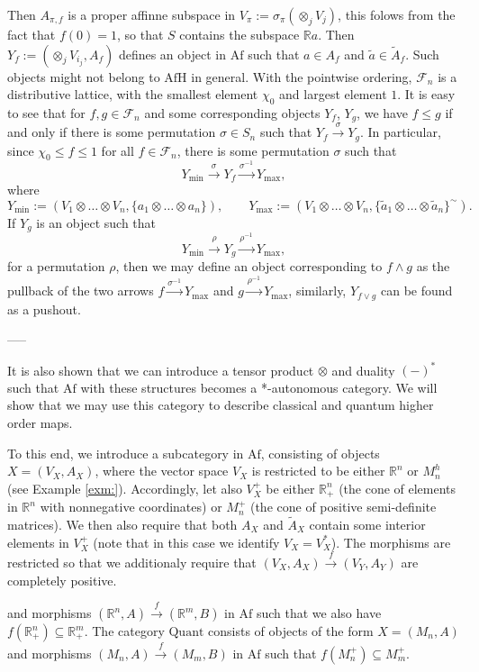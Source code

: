 \documentclass[12pt]{article}
\theoremstyle{definition}
\theoremstyle{remark}
\def\Fe{\mathcal F}
\def \Afh{\mathrm{AfH}}
\def \Af{\mathrm{Af}}
\def\Quant{\mathrm{Quant}}
\begin{document}
Then $A_{\pi,f}$ is a proper affinne subspace in $V_\pi:=\sigma_\pi(\otimes_{j}V_{j})$, this folows from the
fact that $f(0)=1$, so that $S$ contains the subspace $\mathbb R a$. 
Then $Y_f:=(\otimes_{j}V_{i_j},A_f)$ defines an object in $\Af$ such that $a\in A_f$ and
$\tilde a\in \tilde A_f$. Such objects might not belong to $\Afh$ in
general.
With the pointwise ordering, $\Fe_n$ is a distributive lattice, with the smallest element
$\chi_0$ and largest element $1$.  It is easy to see that for  $f,g\in \Fe_n$ and some
corresponding objects $Y_f$, $Y_g$, we have $f\le g$  if
and only if there is some permutation $\sigma\in S_n$ such that 
$Y_f\xrightarrow{\sigma} Y_g$. In particular, since $\chi_0\le f\le 1$ for all $f\in
\Fe_n$, there is some permutation $\sigma$ such that 
\[
Y_{\min}\xrightarrow{\sigma} Y_f\xrightarrow{\sigma^{-1}} Y_{\max},
\]
where 
\[
Y_{\min}:=(V_1\otimes\dots\otimes V_n, \{a_1\otimes\dots\otimes a_n\}),\qquad
Y_{\max}:=(V_1\otimes \dots\otimes V_n,\{\tilde a_1\otimes\dots\otimes \tilde a_n\}^\sim).
\]
If $Y_g$ is an object such that 
\[
Y_{\min}\xrightarrow{\rho} Y_g\xrightarrow{\rho^{-1}} Y_{\max},
\]
for a permutation $\rho$, then we may define an object corresponding to $f\wedge g$ as the
pullback of the two arrows $f\xrightarrow{\sigma^{-1}} Y_{\max}$ and
$g\xrightarrow{\rho^{-1}} Y_{\max}$, similarly, $Y_{f\vee g}$ can be found as a pushout.


-----



It is also shown that we can introduce a tensor product $\otimes$
and duality $(-)^*$ such that $\Af$ with these structures becomes a *-autonomous category.
We will show that we may use this category to describe classical and quantum higher order
maps. 


To this end, we introduce a subcategory in  $\Af$, consisting of objects $X=(V_X,A_X)$, where the vector
space $V_X$ is restricted to be either $\mathbb R^n$ or $M_n^h$ (see Example \ref{exm:}). 
Accordingly, let also $V_X^+$ be either $\mathbb R^n_+$ (the cone of elements in $\mathbb R^n$
with nonnegative coordinates) or  $M_n^+$ (the cone of positive semi-definite matrices).
We then also require that both $A_X$ and $\tilde A_X$ contain some interior elements in
$V_X^+$ (note that in this case we identify $V_X=V_X^*$). The morphisms are restricted so
that we additionaly require that $(V_X,A_X)\xrightarrow{f}(V_Y,A_Y)$ are completely
positive.





and morphisms  $(\mathbb R^n,A)\xrightarrow{f} (\mathbb R^m,B)$  
in $\Af$ such that we also have $f(\mathbb R^n_+)\subseteq \mathbb R^m_+$. The category
$\Quant$ consists of objects of the form $X=(M_n,A)$ and morphisms
$(M_n,A)\xrightarrow{f} (M_m,B)$ in $\Af$ such that $f(M_n^+)\subseteq M_m^+$.
\end{document}

